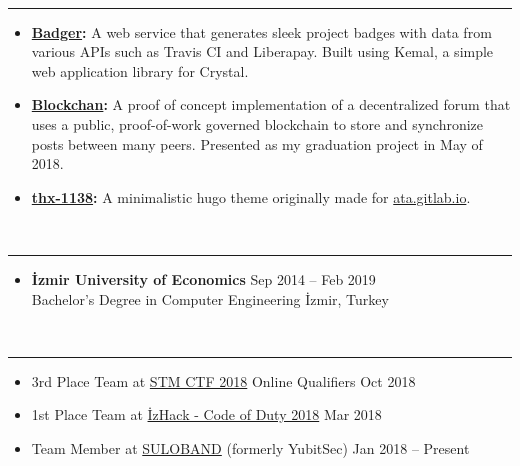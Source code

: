\documentclass[a4paper, 11pt]{article}
\newcommand{\resumeSection}[1]{\vspace{12pt}{\Large \bfseries #1} \vspace{-9pt} \\ \rule{\textwidth}{0.7pt}}
\newcommand{\resumeSubsection}[1]{\textbf{#1}}
\begin{document}
	\medskip
	\resumeSection{Projects}
	
	\begin{itemize}
		\item \resumeSubsection{\href{https://github.com/LVMBDV/badger}{Badger}:} A web service that generates sleek project badges with data from various APIs such as Travis CI and Liberapay. Built using Kemal, a simple web application library for Crystal.
		\item \resumeSubsection{\href{https://github.com/LVMBDV/blockchan}{Blockchan}:} A proof of concept implementation of a decentralized forum that uses a public, proof-of-work governed blockchain to store and synchronize posts between many peers. Presented as my graduation project in May of 2018.
		\item \resumeSubsection{\href{https://gitlab.com/Ata/thx-1138}{thx-1138}:} A minimalistic hugo theme originally made for \href{https://ata.gitlab.io}{ata.gitlab.io}.
	\end{itemize}
	
	\medskip
	\resumeSection{Education}
	
	\begin{itemize}
		\item \resumeSubsection{İzmir University of Economics} \hfill Sep 2014 – Feb 2019 \\
		Bachelor’s Degree in Computer Engineering \hfill İzmir, Turkey
	\end{itemize}
	
	\medskip
	\resumeSection{Extracurricular Activities}
	
	\begin{itemize}
		\item 3rd Place Team at \href{https://ctf.stm.com.tr}{STM CTF 2018} Online Qualifiers \hfill Oct 2018
		\item 1st Place Team at \href{http://codeofduty.iyte.edu.tr}{İzHack - Code of Duty 2018} \hfill Mar 2018
		\item Team Member at \href{https://twitter.com/Suloband}{SULOBAND} (formerly YubitSec) \hfill Jan 2018 – Present
	\end{itemize}
\end{document}
